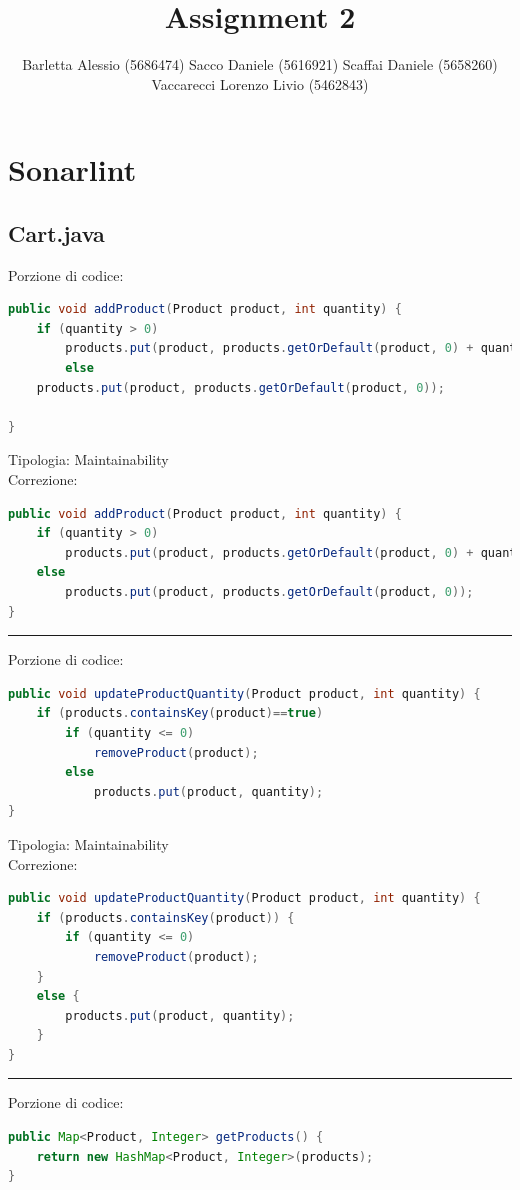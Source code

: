 \documentclass{article}
\title{Assignment 2}
\author{\footnotesize Barletta Alessio (5686474)
Sacco Daniele (5616921)
Scaffai Daniele (5658260)
Vaccarecci Lorenzo Livio (5462843)\normalsize}
\date{}
\begin{document}
\maketitle

\section{Sonarlint}
\subsection{Cart.java}
Porzione di codice:
\begin{lstlisting}[language=Java]
public void addProduct(Product product, int quantity) {
    if (quantity > 0)
        products.put(product, products.getOrDefault(product, 0) + quantity);
        else 
    products.put(product, products.getOrDefault(product, 0));

}
\end{lstlisting}
Tipologia: Maintainability\\
Correzione:
\begin{lstlisting}[language=Java]
public void addProduct(Product product, int quantity) {
    if (quantity > 0)
        products.put(product, products.getOrDefault(product, 0) + quantity);
    else 
        products.put(product, products.getOrDefault(product, 0));
}
\end{lstlisting}
\vspace{.5em}\hrule\vspace{.5em}
Porzione di codice:
\begin{lstlisting}[language=Java]
public void updateProductQuantity(Product product, int quantity) {
    if (products.containsKey(product)==true)
        if (quantity <= 0) 
            removeProduct(product);
        else 
            products.put(product, quantity);
}
\end{lstlisting}
Tipologia: Maintainability\\
Correzione:
\begin{lstlisting}[language=Java]
public void updateProductQuantity(Product product, int quantity) {
    if (products.containsKey(product)) {
        if (quantity <= 0) 
            removeProduct(product);
    }
    else { 
        products.put(product, quantity);
    }
}
\end{lstlisting}
\vspace{.5em}\hrule\vspace{.5em}
Porzione di codice:
\begin{lstlisting}[language=Java]
public Map<Product, Integer> getProducts() {
    return new HashMap<Product, Integer>(products);
}
\end{lstlisting}
\end{document}
